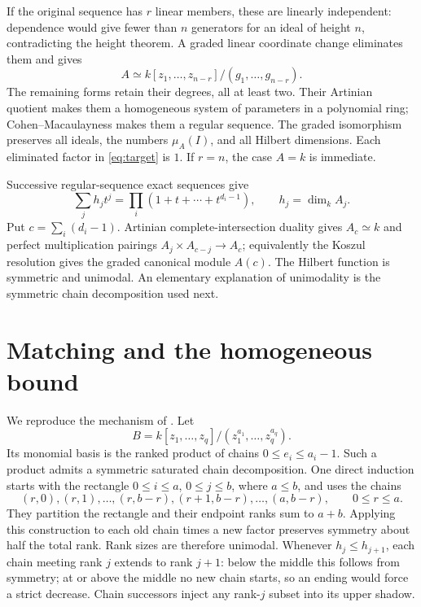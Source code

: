 \documentclass[11pt]{article}
\begin{document}
If the original sequence has \(r\) linear members, these are linearly
independent: dependence would give fewer than \(n\) generators for an
ideal of height \(n\), contradicting the height theorem. A graded
linear coordinate change eliminates them and gives
\[
 A\simeq k[z_1,\ldots,z_{n-r}]/(g_1,\ldots,g_{n-r}).
\]
The remaining forms retain their degrees, all at least two. Their
Artinian quotient makes them a homogeneous system of parameters in a
polynomial ring; Cohen--Macaulayness makes them a regular sequence.
The graded isomorphism preserves all ideals, the numbers \(\mu_A(I)\),
and all Hilbert dimensions. Each eliminated factor in
\eqref{eq:target} is \(1\). If \(r=n\), the case \(A=k\) is immediate.

Successive regular-sequence exact sequences give
\begin{equation}\label{eq:hilbert}
 \sum_j h_jt^j
 =\prod_i(1+t+\cdots+t^{d_i-1}),
 \qquad h_j=\dim_k A_j.
\end{equation}
Put \(c=\sum_i(d_i-1)\). Artinian complete-intersection duality gives
\(A_c\simeq k\) and perfect multiplication pairings
\(A_j\times A_{c-j}\to A_c\); equivalently the Koszul resolution
gives the graded canonical module \(A(c)\).
The Hilbert function is symmetric and unimodal. An elementary explanation
of unimodality is the symmetric chain decomposition used next.

\section{Matching and the homogeneous bound}
We reproduce the mechanism of \cite[Propositions~7--8 and Theorem~11]{HWW}.
Let
\[
 B=k[z_1,\ldots,z_q]/(z_1^{a_1},\ldots,z_q^{a_q}).
\]
Its monomial basis is the ranked product of chains
\(0\le e_i\le a_i-1\).
Such a product admits a symmetric saturated chain decomposition.
One direct induction starts with the rectangle \(0\le i\le a\),
\(0\le j\le b\), where \(a\le b\), and uses the chains
\[
 (r,0),(r,1),\ldots,(r,b-r),(r+1,b-r),\ldots,(a,b-r),
 \qquad 0\le r\le a.
\]
They partition the rectangle and their endpoint ranks sum to \(a+b\).
Applying this construction to each old chain times a new factor preserves
symmetry about half the total rank. Rank sizes are therefore unimodal.
Whenever \(h_j\le h_{j+1}\), each chain meeting rank \(j\) extends
to rank \(j+1\): below the middle this follows from symmetry; at or
above the middle no new chain starts, so an ending would force a strict
decrease. Chain successors inject any rank-\(j\) subset into its
upper shadow.
\end{document}
